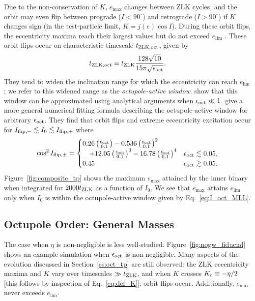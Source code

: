 \documentclass[
        fleqn,
        usenatbib,
    ]{mnras}
\newcommand*{\p}[1]{\left(#1\right)}
\begin{document}
Due to the non-conservation of $K$, $e_{\max}$ changes between ZLK cycles, and
the orbit may even flip between prograde ($I < 90^\circ$) and retrograde ($I >
90^\circ$) if $K$ changes sign (in the test-particle limit, $K = j(e) \cos I$).
During these orbit flips, the eccentricity maxima reach their largest values but
do not exceed $e_{\lim}$ \citep{lithwick2011eccentric, LML15,
anderson2016formation}. These orbit flips occur on characteristic timescale
$t_{\rm ZLK, oct}$, given by \citep{antognini2015timescales}
\begin{equation}
    t_{\rm ZLK, oct} = t_{\rm ZLK}\frac{128\sqrt{10}}{
        15\pi\sqrt{\epsilon_{\rm oct}}}.\label{eq:def_tzlkoct}
\end{equation}
They tend to widen the inclination range for which the eccentricity can reach
$e_{\lim}$; we refer to this widened range as the \emph{octupole-active window}.
\citet{katz2011long} show that this window can be approximated using
analytical arguments when $\epsilon_{\rm oct} \ll 1$. \citet{MLL16} give a more
general numerical fitting formula describing the octupole-active window for
arbitrary $\epsilon_{\rm oct}$. They find that orbit flips and extreme
eccentricity excitation occur for $I_{\rm flip, -} \lesssim I_0 \lesssim I_{\rm
flip, +}$ where
\begin{equation}
    \cos^2 I_{\rm flip, \pm} = \begin{cases}
        0.26\p{\frac{\epsilon_{\rm oct}}{0.1}}
            - 0.536\p{\frac{\epsilon_{\rm oct}}{0.1}}^2\\
            \quad + 12.05\p{\frac{\epsilon_{\rm oct}}{0.1}}^3
            - 16.78\p{\frac{\epsilon_{\rm oct}}{0.1}}^4
            & \epsilon_{\rm oct} \lesssim 0.05,\\
        0.45 & \epsilon_{\rm oct} \gtrsim 0.05.
    \end{cases} \label{eq:I_oct_MLL}
\end{equation}
Figure~\ref{fig:composite_tp} shows the maximum $e_{\max}$ attained by the inner
binary when integrated for $2000t_{\rm ZLK}$ as a function of $I_0$. We see that
$e_{\max}$ attains $e_{\lim}$ only when $I_0$ is within the octupole-active
window given by Eq.~\eqref{eq:I_oct_MLL}.

\subsection{Octupole Order: General Masses}\label{ss:oct_gen}

The case when $\eta$ is non-negligible is less well-studied.
Figure~\ref{fig:nogw_fiducial} shows an example simulation when $\epsilon_{\rm
oct}$ is non-negligible. Many aspects of the evolution discussed in
Section~\ref{ss:oct_tp} are still observed: the ZLK eccentricity maxima and $K$
vary over timescales $\gg t_{\rm ZLK}$, and when $K$ crosses $K_{\rm c} \equiv
-\eta / 2$ [this follows by inspection of Eq.~\eqref{eq:def_K}], orbit flips
occur. Additionally, $e_{\max}$ never exceeds $e_{\lim}$.
\end{document}
